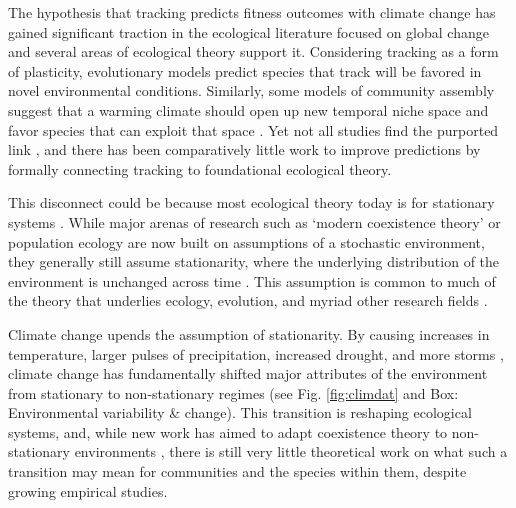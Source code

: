 \documentclass[11pt,letterpaper]{article}
\begin{document}
The hypothesis that tracking predicts fitness outcomes with climate change has gained significant traction in the ecological literature focused on global change \citep[e.g.,][]{Cleland:2012} and several areas of ecological theory support it. Considering tracking as a form of plasticity, evolutionary models predict species that track will be favored in novel environmental conditions. Similarly, some models of community assembly suggest that a warming climate should open up new temporal niche space and favor species that can exploit that space \citep{gotelli1996,wolkovich:2010fee,Zettlemoyer2019}. Yet not all studies find the purported link \citep[e.g.,][]{block2019}, and there has been comparatively little work to improve predictions by formally connecting tracking to foundational ecological theory. %

This disconnect could be because most ecological theory today is for stationary systems \citep[e.g.,][]{Sale:1977oq,Chesson:1997dz}. While major arenas of research such as `modern coexistence theory' or population ecology are now built on assumptions of a stochastic environment, they generally still assume stationarity, where the underlying distribution of the environment is unchanged across time \citep[i.e., constant mean and variance,][]{barabas2018}. This assumption is common to much of the theory that underlies ecology, evolution, and myriad other research fields \citep[e.g.,][]{Milly:2008yu,nosenko2013}. 

Climate change upends the assumption of stationarity. By causing increases in temperature, larger pulses of precipitation, increased drought, and more storms \citep{ipcc2013}, climate change has fundamentally shifted major attributes of the environment from stationary to non-stationary regimes (see Fig. \ref{fig:climdat} and Box: Environmental variability \& change). This transition is reshaping ecological systems, and, while new work has aimed to adapt coexistence theory to non-stationary environments \citep{chessonnonstat,volkerass}, there is still very little theoretical work on what such a transition may mean for communities and the species within them, despite growing empirical studies.  %
\end{document}
